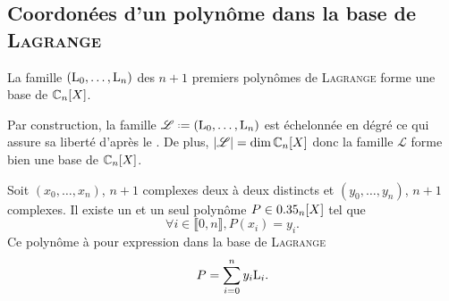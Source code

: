 \subsection{Coordonées d'un polynôme dans la base de \textsc{Lagrange}}

\begin{prop}{}
    La famille $(\mathrm{L}_0, \dots, \mathrm{L}_n)$ des $n+1$ premiers polynômes de \textsc{Lagrange} forme une base de $\mathbb{C}_n[X]$.
\end{prop}

\begin{preuve} 
    Par construction, la famille $\mathscr{L} \defeq (\Lag_0, \dots, \Lag_n)$ est échelonnée en dégré ce qui assure sa liberté d'après le . De plus, $|\mathscr{L}| = \dim \mathbb{C}_n[X]$ donc la famille $\mathscr{L}$ forme bien une base de $\mathbb{C}_n[X]$.
\end{preuve}

\begin{prop}{}
Soit $(x_0, \dots, x_n)$, $n+1$ complexes deux à deux distincts et $(y_0, \dots, y_n)$, $n+1$ complexes. Il existe un et un seul polynôme $P \in 0.35_n[X]$ tel que 
$$\forall i \in \llbracket 0, n \rrbracket, P(x_i) = y_i.$$ 
Ce polynôme à pour expression dans la base de \textsc{Lagrange}
$$P = \sum_{i=0}^n y_i \mathrm{L}_i.$$
\end{prop}